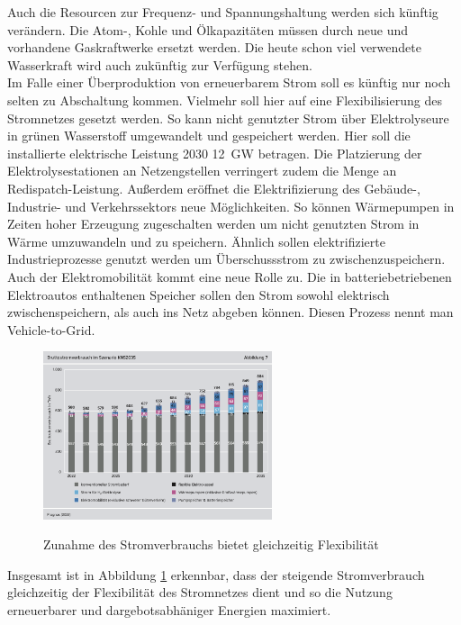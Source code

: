 		Auch die Resourcen zur Frequenz- und Spannungshaltung werden sich künftig verändern. Die Atom-, Kohle und Ölkapazitäten müssen durch neue und vorhandene Gaskraftwerke ersetzt werden. Die heute schon viel verwendete Wasserkraft wird auch zukünftig zur Verfügung stehen.\\
		Im Falle einer Überproduktion von erneuerbarem Strom soll es künftig nur noch selten zu Abschaltung kommen. Vielmehr soll hier auf eine Flexibilisierung des Stromnetzes gesetzt werden. So kann nicht genutzter Strom über Elektrolyseure in grünen Wasserstoff umgewandelt und gespeichert werden. Hier soll die installierte elektrische Leistung 2030 \SI{12}{\giga \watt } betragen. \cite[S.11]{Agora_KlimaneutralesStromsystem} Die Platzierung der Elektrolysestationen an Netzengstellen verringert zudem die Menge an Redispatch-Leistung. Außerdem eröffnet die Elektrifizierung des Gebäude-, Industrie- und Verkehrssektors neue Möglichkeiten. So können Wärmepumpen in Zeiten hoher Erzeugung zugeschalten werden um nicht genutzten Strom in Wärme umzuwandeln und zu speichern. Ähnlich sollen elektrifizierte Industrieprozesse genutzt werden um Überschussstrom zu zwischenzuspeichern.\\
		Auch der Elektromobilität kommt eine neue Rolle zu. Die in batteriebetriebenen Elektroautos enthaltenen Speicher sollen den Strom sowohl elektrisch zwischenspeichern, als auch ins Netz abgeben können. Diesen Prozess nennt man Vehicle-to-Grid.\\
			
			\begin{figure}[H]
				\centering
				\includegraphics[page=1, clip, width=0.6\textwidth]{./anhang/Zunahme Stromverbrauch Agora2035.png}
				\caption{Zunahme des Stromverbrauchs bietet gleichzeitig Flexibilität}
				\label{Abb. Zunahme Flexibilität} \cite[S.33]{Agora_KlimaneutralesStromsystem}
			\end{figure}
		
		Insgesamt ist in Abbildung \ref{Abb. Zunahme Flexibilität} erkennbar, dass der steigende Stromverbrauch gleichzeitig der Flexibilität des Stromnetzes dient und so die Nutzung erneuerbarer und dargebotsabhäniger Energien maximiert.\\
		
